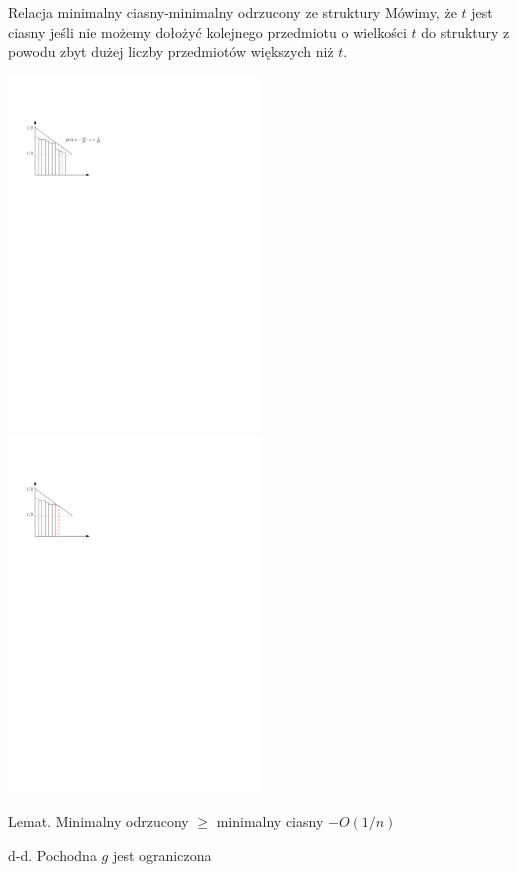 \documentclass{beamer}
\begin{document}
\begin{frame}{Relacja minimalny ciasny-minimalny odrzucony ze struktury}
  Mówimy, że $t$ jest ciasny jeśli nie możemy dołożyć kolejnego przedmiotu o wielkości $t$ do struktury z powodu zbyt dużej liczby przedmiotów większych niż $t$. 
  \vspace{-0.5cm}
  \begin{center}
    \includegraphics[width=0.5\textwidth]{figs/D.pdf}
    \includegraphics[width=0.5\textwidth]{figs/D_tight.pdf}
    \end{center}

    Lemat. Minimalny odrzucony $\geq$ minimalny ciasny $- O(1/n)$

    d-d. Pochodna $g$ jest ograniczona
\end{frame}
\end{document}
